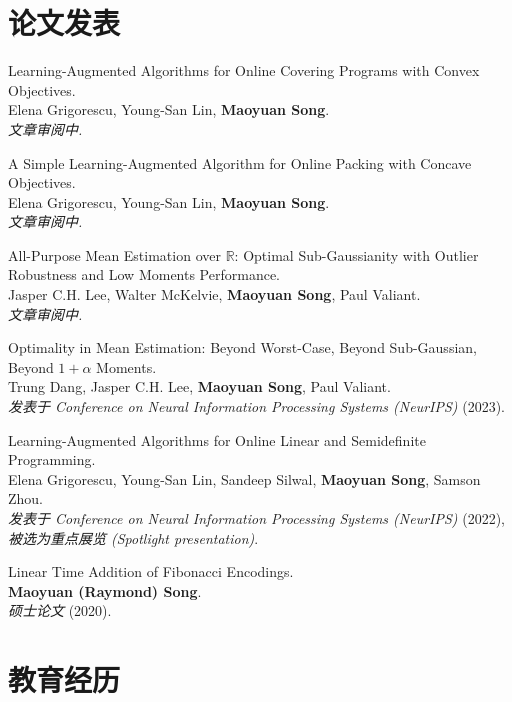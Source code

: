 \documentclass[margin, 10pt]{res} %
\begin{document}
\begin{resume}
\section{论文发表}
\begin{etaremune}
\item Learning-Augmented Algorithms for Online Covering Programs with Convex Objectives.\\
Elena Grigorescu, Young-San Lin, {\bf Maoyuan Song}.\\
\emph{文章审阅中.}
\item A Simple Learning-Augmented Algorithm for Online Packing with Concave Objectives.\\
Elena Grigorescu, Young-San Lin, {\bf Maoyuan Song}.\\
\emph{文章审阅中.}
\item All-Purpose Mean Estimation over $\mathbb{R}$: Optimal Sub-Gaussianity with Outlier Robustness and Low Moments Performance.\\
Jasper C.H. Lee, Walter McKelvie, {\bf Maoyuan Song}, Paul Valiant.\\
\emph{文章审阅中.}
\item Optimality in Mean Estimation: Beyond Worst-Case, Beyond Sub-Gaussian, Beyond $1 + \alpha$ Moments.\\
Trung Dang, Jasper C.H. Lee, {\bf Maoyuan Song}, Paul Valiant.\\
\emph{发表于 Conference on Neural Information Processing Systems (NeurIPS)} (2023).
\item Learning-Augmented Algorithms for Online Linear and Semidefinite Programming.\\
Elena Grigorescu, Young-San Lin, Sandeep Silwal, {\bf Maoyuan Song}, Samson Zhou.\\
\emph{发表于 Conference on Neural Information Processing Systems (NeurIPS)} (2022), \emph{被选为重点展览 (Spotlight presentation)}.
\item Linear Time Addition of Fibonacci Encodings.\\
{\bf Maoyuan (Raymond) Song}.\\
\emph{硕士论文} (2020).
\end{etaremune}


\section{教育经历}


\end{resume}
\end{document}
